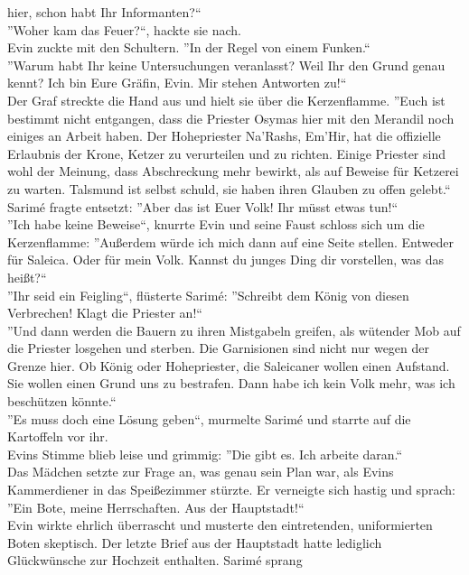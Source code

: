hier, schon habt Ihr Informanten?``\\
''Woher kam das Feuer?``, hackte sie nach.\\
Evin zuckte mit den Schultern. ''In der Regel von einem Funken.``\\
''Warum habt Ihr keine Untersuchungen veranlasst? Weil Ihr den Grund genau kennt? Ich bin Eure 
Gräfin, Evin. Mir stehen Antworten zu!``\\
Der Graf streckte die Hand aus und hielt sie über die Kerzenflamme. ''Euch ist bestimmt nicht 
entgangen, dass die Priester Osymas hier mit den Merandil noch einiges an Arbeit haben. Der 
Hohepriester Na'Rashs, Em'Hir, hat die offizielle Erlaubnis der Krone, Ketzer zu verurteilen und 
zu richten. Einige Priester sind wohl der Meinung, dass Abschreckung mehr bewirkt, als auf Beweise 
für Ketzerei zu warten. Talsmund ist selbst schuld, sie haben ihren Glauben zu offen gelebt.``\\
Sarimé fragte entsetzt: ''Aber das ist Euer Volk! Ihr müsst etwas tun!``\\
''Ich habe keine Beweise``, knurrte Evin und seine Faust schloss sich um die Kerzenflamme: 
''Außerdem würde ich mich dann auf eine Seite stellen. Entweder für Saleica. Oder für mein Volk. 
Kannst du junges Ding dir vorstellen, was das heißt?``\\
''Ihr seid ein Feigling``, flüsterte Sarimé: ''Schreibt dem König von diesen Verbrechen! Klagt die 
Priester an!``\\
''Und dann werden die Bauern zu ihren Mistgabeln greifen, als wütender Mob auf die Priester 
losgehen und sterben. Die Garnisionen sind nicht nur wegen der Grenze hier. Ob König oder 
Hohepriester, die Saleicaner wollen einen Aufstand. Sie wollen einen Grund uns zu bestrafen. Dann 
habe ich kein Volk mehr, was ich beschützen könnte.``\\
''Es muss doch eine Lösung geben``, murmelte Sarimé und starrte auf die Kartoffeln vor ihr.\\
Evins Stimme blieb leise und grimmig: ''Die gibt es. Ich arbeite daran.``\\
Das Mädchen setzte zur Frage an, was genau sein Plan war, als Evins Kammerdiener in das 
Speißezimmer stürzte. Er verneigte sich hastig und sprach: ''Ein Bote, meine Herrschaften. Aus 
der Hauptstadt!``\\
Evin wirkte ehrlich überrascht und musterte den eintretenden, uniformierten Boten skeptisch. Der 
letzte Brief aus der Hauptstadt hatte lediglich Glückwünsche zur Hochzeit enthalten. Sarimé sprang 
